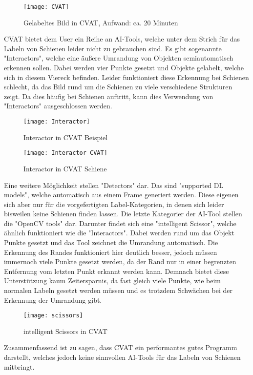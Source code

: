 \documentclass[11pt]{scrartcl}
\begin{document}
\begin{figure}[H]
  \texttt{[image: CVAT]}
  \caption{Gelabeltes Bild in CVAT, Aufwand: ca. 20 Minuten}
\end{figure}

\noindent
CVAT bietet dem User ein Reihe an AI-Tools, welche unter dem Strich für das Labeln von Schienen leider nicht zu gebrauchen sind. Es gibt sogenannte "Interactors", welche eine äußere Umrandung von Objekten semiautomatisch erkennen sollen. Dabei werden vier Punkte gesetzt und Objekte gelabelt, welche sich in diesem Viereck befinden. Leider funktioniert diese Erkennung bei Schienen schlecht, da das Bild rund um die Schienen zu viele verschiedene Strukturen zeigt. Da dies häufig bei Schienen auftritt, kann dies Verwendung von "Interactors" ausgeschlossen werden. 
\begin{figure}[H]
  \texttt{[image: Interactor]}
  \caption{Interactor in CVAT Beispiel}
\end{figure}
\begin{figure}[H]
  \texttt{[image: Interactor CVAT]}
  \caption{Interactor in CVAT Schiene }
\end{figure}

\noindent
Eine weitere Möglichkeit stellen "Detectors" dar. Das sind "supported DL models", welche automatisch aus einem Frame generiert werden. Diese eigenen sich aber nur für die vorgefertigten Label-Kategorien, in denen sich leider bisweilen keine Schienen finden lassen. Die letzte Kategorier der AI-Tool stellen die "OpenCV tools" dar. Darunter findet sich eine "intelligent Scissor", welche ähnlich funktioniert wie die "Interactors". Dabei werden rund um das Objekt Punkte gesetzt und das Tool zeichnet die Umrandung automatisch. Die Erkennung des Randes funktioniert hier deutlich besser, jedoch müssen immernoch viele Punkte gesetzt werden, da der Rand nur in einer begrenzten Entfernung vom letzten Punkt erkannt werden kann. Demnach bietet diese Unterstützung kaum Zeitersparnis, da fast gleich viele Punkte, wie beim normalen Labeln gesetzt werden müssen und es trotzdem Schwächen bei der Erkennung der Umrandung gibt.
\begin{figure}[H]
  \texttt{[image: scissors]}
  \caption{intelligent Scissors in CVAT}
\end{figure}
\noindent
Zusammenfassend ist zu sagen, dass CVAT ein performantes gutes Programm darstellt, welches jedoch keine sinnvollen AI-Tools für das Labeln von Schienen mitbringt.
\\
\end{document}
